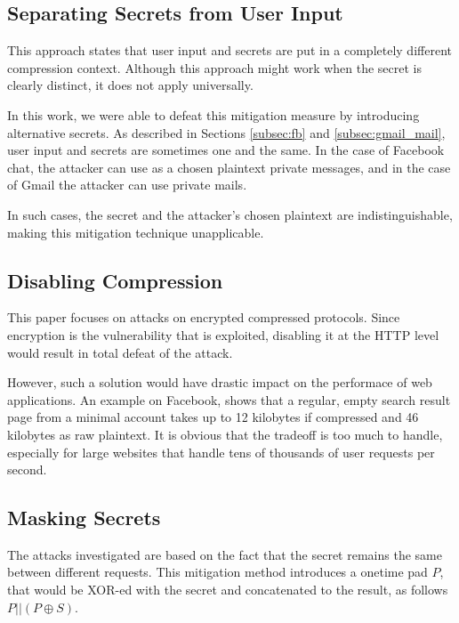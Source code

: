 \subsection{Separating Secrets from User Input}\label{subsec:sep_compression}

This approach states that user input and secrets are put in a completely
different compression context. Although this approach might work when the secret
is clearly distinct, it does not apply universally.

In this work, we were able to defeat this mitigation measure by introducing
alternative secrets. As described in Sections \ref{subsec:fb} and
\ref{subsec:gmail_mail}, user input and secrets are sometimes one and the same.
In the case of Facebook chat, the attacker can use as a chosen plaintext private
messages, and in the case of Gmail the attacker can use private mails.

In such cases, the secret and the attacker's chosen plaintext are
indistinguishable, making this mitigation technique unapplicable.

\subsection{Disabling Compression}

This paper focuses on attacks on encrypted compressed protocols. Since
encryption is the vulnerability that is exploited, disabling it at the HTTP
level would result in total defeat of the attack.

However, such a solution would have drastic impact on the performace of web
applications. An example on Facebook, shows that a regular, empty search result
page from a minimal account takes up to 12 kilobytes if compressed and 46
kilobytes as raw plaintext. It is obvious that the tradeoff is too much to
handle, especially for large websites that handle tens of thousands of user
requests per second.

\subsection{Masking Secrets}

The attacks investigated are based on the fact that the secret remains the same
between different requests. This mitigation method introduces a onetime pad
\begin{math}P\end{math}, that would be XOR-ed with the secret and concatenated
to the result, as follows \begin{math}P||(P \oplus S)\end{math}.

